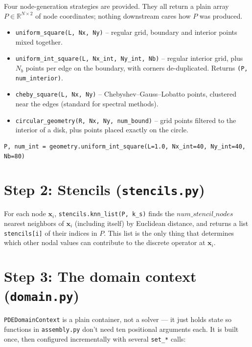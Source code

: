 \documentclass[11pt]{article}
\newcommand{\bx}{\mathbf{x}}
\newcommand{\R}{\mathbb{R}}
\begin{document}
Four node-generation strategies are provided. They all return a plain
array $P \in \R^{N\times 2}$ of node coordinates; nothing downstream
cares how $P$ was produced.

\begin{itemize}[leftmargin=2em]
  \item \texttt{uniform\_square(L, Nx, Ny)} -- regular grid, boundary
        and interior points mixed together.
  \item \texttt{uniform\_int\_square(L, Nx\_int, Ny\_int, Nb)} -- regular
        interior grid, plus $N_b$ points per edge on the boundary,
        with corners de-duplicated. Returns \texttt{(P, num\_interior)}.
  \item \texttt{cheby\_square(L, Nx, Ny)} -- Chebyshev--Gauss--Lobatto
        points, clustered near the edges (standard for spectral
        methods).
  \item \texttt{circular\_geometry(R, Nx, Ny, num\_bound)} -- grid
        points filtered to the interior of a disk, plus points placed
        exactly on the circle.
\end{itemize}

\begin{lstlisting}
P, num_int = geometry.uniform_int_square(L=1.0, Nx_int=40, Ny_int=40, Nb=80)
\end{lstlisting}

\section{Step 2: Stencils (\texttt{stencils.py})}

For each node $\bx_i$, \texttt{stencils.knn\_list(P, k\_s)} finds the
$num\_stencil\_nodes$ nearest neighbors of $\bx_i$ (including itself) by Euclidean
distance, and returns a list \texttt{stencils[i]} of their indices in
$P$. This list is the only thing that determines which other nodal
values can contribute to the discrete operator at $\bx_i$.

\section{Step 3: The domain context (\texttt{domain.py})}

\texttt{PDEDomainContext} is a plain container, not a solver --- it
just holds state so functions in \texttt{assembly.py} don't need ten
positional arguments each. It is built once, then configured
incrementally with several \texttt{set\_*} calls:
\end{document}
